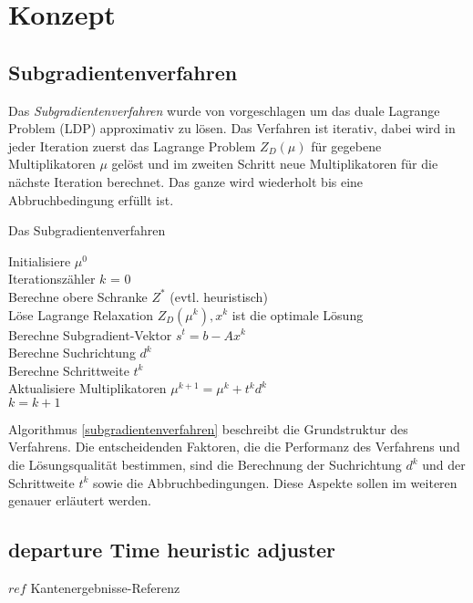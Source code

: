 \chapter{Konzept}

\section{Subgradientenverfahren}
Das \emph{Subgradientenverfahren} wurde von \cite{HeKa71}  vorgeschlagen um das duale Lagrange Problem (LDP) approximativ zu lösen. Das Verfahren ist iterativ, dabei wird in jeder Iteration zuerst das Lagrange Problem $Z_D(\mu)$ für gegebene Multiplikatoren $\mu$ gelöst und im zweiten Schritt neue Multiplikatoren für die nächste Iteration berechnet. Das ganze wird wiederholt bis eine Abbruchbedingung erfüllt ist.
\begin{algorithm}
	\label{subgradientenverfahren}
	\caption{Das Subgradientenverfahren}
	Initialisiere $\mu^0$\\
	Iterationszähler $k$ = 0\\
	Berechne obere Schranke $Z^*$ (evtl. heuristisch)\\	
	 {
		Löse Lagrange Relaxation $Z_D(\mu^k), x^k$ ist die optimale Lösung\\
		Berechne Subgradient-Vektor $s^t = b - Ax^k$\\
		Berechne Suchrichtung $d^k$ \\
		Berechne Schrittweite $t^k$ \\
		Aktualisiere Multiplikatoren $\mu^{k+1} = \mu^k + t^k d^k$\\
		$k = k + 1$\\
	}
\end{algorithm}

Algorithmus \ref{subgradientenverfahren} beschreibt die Grundstruktur des Verfahrens. Die entscheidenden Faktoren, die die Performanz des Verfahrens und die Lösungsqualität bestimmen, sind die Berechnung der Suchrichtung $d^k$ und der Schrittweite $t^k$ sowie die Abbruchbedingungen. Diese Aspekte sollen im weiteren genauer erläutert werden.

\section{departure Time heuristic adjuster}



\(ref\) Kantenergebnisse-Referenz

